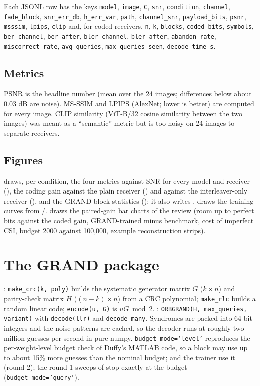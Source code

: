 \documentclass{article}
\begin{document}
Each JSONL row has the keys \texttt{model}, \texttt{image}, \texttt{C}, \texttt{snr}, \texttt{condition},
\texttt{channel}, \texttt{fade\_block}, \texttt{snr\_err\_db}, \texttt{h\_err\_var}, \texttt{path},
\texttt{channel\_snr}, \texttt{payload\_bits}, \texttt{psnr}, \texttt{msssim}, \texttt{lpips},
\texttt{clip} and, for coded receivers, \texttt{n}, \texttt{k}, \texttt{blocks}, \texttt{coded\_bits},
\texttt{symbols}, \texttt{ber\_channel}, \texttt{ber\_after}, \texttt{bler\_channel},
\texttt{bler\_after}, \texttt{abandon\_rate}, \texttt{miscorrect\_rate}, \texttt{avg\_queries},
\texttt{max\_queries\_seen}, \texttt{decode\_time\_s}.

\subsection{Metrics}

PSNR is the headline number (mean over the 24 images; differences below about 0.03 dB are noise).
MS-SSIM and LPIPS (AlexNet; lower is better) are computed for every image. CLIP similarity (ViT-B/32
cosine similarity between the two images) was meant as a ``semantic'' metric but is too noisy on 24
images to separate receivers.

\subsection{Figures}

 draws, per condition, the four metrics against SNR for every model and receiver
(), the coding gain against the plain receiver () and against the
interleaver-only receiver (), and the GRAND block statistics
(); it also writes .  draws the training
curves from /.  draws the paired-gain bar charts
of the review (room up to perfect bits against the coded gain, GRAND-trained minus benchmark, cost of
imperfect CSI, budget 2000 against 100{,}000, example reconstruction strips).

\section{The GRAND package}

: \texttt{make\_crc(k, poly)} builds the systematic generator matrix $G$ ($k\times
n$) and parity-check matrix $H$ ($(n-k)\times n$) from a CRC polynomial; \texttt{make\_rlc} builds a
random linear code; \texttt{encode(u, G)} is $uG \bmod 2$. :
\texttt{ORBGRAND(H, max\_queries, variant)} with \texttt{decode(llr)} and \texttt{decode\_many}. Syndromes
are packed into 64-bit integers and the noise patterns are cached, so the decoder runs at roughly two
million guesses per second in pure numpy. \texttt{budget\_mode='level'} reproduces the per-weight-level
budget check of Duffy's MATLAB code, so a block may use up to about 15\% more guesses than the nominal
budget;  and the trainer use it (round 2); the round-1 sweeps of  stop exactly at
the budget (\texttt{budget\_mode='query'}).
\end{document}
